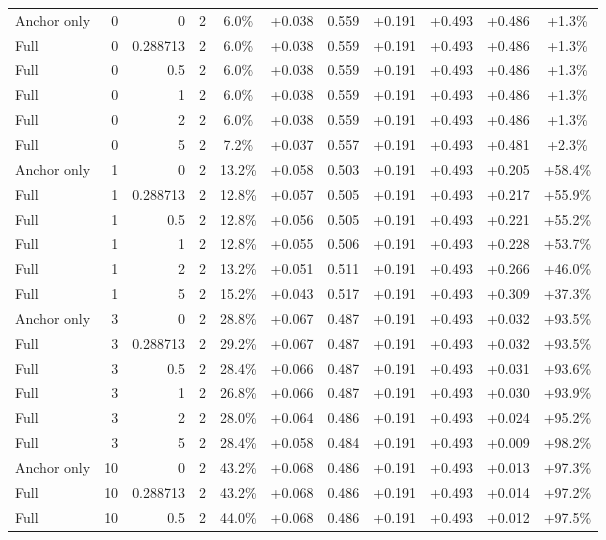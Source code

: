\begin{table}[htbp]
\begin{tabular}{lrrrccccccc}
Anchor only & 0 & 0 & 2 & 6.0\% & +0.038 & 0.559 & +0.191 & +0.493 & +0.486 & +1.3\% \\
Full & 0 & 0.288713 & 2 & 6.0\% & +0.038 & 0.559 & +0.191 & +0.493 & +0.486 & +1.3\% \\
Full & 0 & 0.5 & 2 & 6.0\% & +0.038 & 0.559 & +0.191 & +0.493 & +0.486 & +1.3\% \\
Full & 0 & 1 & 2 & 6.0\% & +0.038 & 0.559 & +0.191 & +0.493 & +0.486 & +1.3\% \\
Full & 0 & 2 & 2 & 6.0\% & +0.038 & 0.559 & +0.191 & +0.493 & +0.486 & +1.3\% \\
Full & 0 & 5 & 2 & 7.2\% & +0.037 & 0.557 & +0.191 & +0.493 & +0.481 & +2.3\% \\
Anchor only & 1 & 0 & 2 & 13.2\% & +0.058 & 0.503 & +0.191 & +0.493 & +0.205 & +58.4\% \\
Full & 1 & 0.288713 & 2 & 12.8\% & +0.057 & 0.505 & +0.191 & +0.493 & +0.217 & +55.9\% \\
Full & 1 & 0.5 & 2 & 12.8\% & +0.056 & 0.505 & +0.191 & +0.493 & +0.221 & +55.2\% \\
Full & 1 & 1 & 2 & 12.8\% & +0.055 & 0.506 & +0.191 & +0.493 & +0.228 & +53.7\% \\
Full & 1 & 2 & 2 & 13.2\% & +0.051 & 0.511 & +0.191 & +0.493 & +0.266 & +46.0\% \\
Full & 1 & 5 & 2 & 15.2\% & +0.043 & 0.517 & +0.191 & +0.493 & +0.309 & +37.3\% \\
Anchor only & 3 & 0 & 2 & 28.8\% & +0.067 & 0.487 & +0.191 & +0.493 & +0.032 & +93.5\% \\
Full & 3 & 0.288713 & 2 & 29.2\% & +0.067 & 0.487 & +0.191 & +0.493 & +0.032 & +93.5\% \\
Full & 3 & 0.5 & 2 & 28.4\% & +0.066 & 0.487 & +0.191 & +0.493 & +0.031 & +93.6\% \\
Full & 3 & 1 & 2 & 26.8\% & +0.066 & 0.487 & +0.191 & +0.493 & +0.030 & +93.9\% \\
Full & 3 & 2 & 2 & 28.0\% & +0.064 & 0.486 & +0.191 & +0.493 & +0.024 & +95.2\% \\
Full & 3 & 5 & 2 & 28.4\% & +0.058 & 0.484 & +0.191 & +0.493 & +0.009 & +98.2\% \\
Anchor only & 10 & 0 & 2 & 43.2\% & +0.068 & 0.486 & +0.191 & +0.493 & +0.013 & +97.3\% \\
Full & 10 & 0.288713 & 2 & 43.2\% & +0.068 & 0.486 & +0.191 & +0.493 & +0.014 & +97.2\% \\
Full & 10 & 0.5 & 2 & 44.0\% & +0.068 & 0.486 & +0.191 & +0.493 & +0.012 & +97.5\% \\

\end{tabular}
\end{table}
